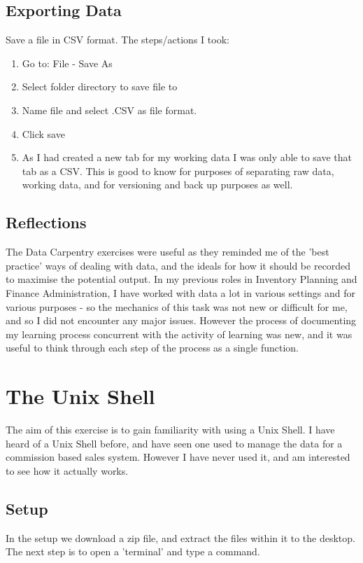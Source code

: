 \documentclass{article}
\begin{document}
\subsection{Exporting Data}
Save a file in CSV format.
The steps/actions I took:
\begin{enumerate}
    \item Go to: File - Save As
    \item Select folder directory to save file to
    \item Name file and select .CSV as file format.
    \item Click save
    \item As I had created a new tab for my working data I was only able to save that tab as a CSV. This is good to know for purposes of separating raw data, working data, and for versioning and back up purposes as well. 
\end{enumerate}

\subsection{Reflections}
The Data Carpentry exercises were useful as they reminded me of the 'best practice' ways of dealing with data, and the ideals for how it should be recorded to maximise the potential output. 
In my previous  roles in Inventory Planning and Finance Administration, I have worked with data a lot in various settings and for various purposes - so the mechanics of this task was not new or difficult for me, and so I did not encounter any major issues. 
However the process of documenting my learning process concurrent with the activity of learning was new, and it was useful to think through each step of the process as a single function. 

\section{The Unix Shell}

The aim of this exercise is to gain familiarity with using a Unix Shell. 
I have heard of a Unix Shell before, and have seen one used to manage the data for a commission based sales system. However I have never used it, and am interested to see how it actually works. 

\subsection{Setup}
In the setup we download a zip file, and extract the files within it to the desktop. 
The next step is to open a 'terminal' and type a command. 
\end{document}
